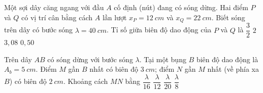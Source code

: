 \begin{ex}%
Một sợi dây căng ngang với đầu $A$ cố định (nút) đang có sóng dừng.  
Hai điểm $P$ và $Q$ có vị trí cân bằng cách $A$ lần lượt $x_P=12\ cm$ và $x_Q=22\ cm$.  
Biết sóng trên dây có bước sóng $\lambda=40\ cm$.  
Tỉ số giữa biên độ dao động của $P$ và $Q$ là
\choice
{$\dfrac{3}{2}$}
{$2$}
{\True $3,08$}
{$0,50$}
\end{ex}
\begin{ex}%
Trên dây $AB$ có sóng dừng với bước sóng $\lambda$. Tại một bụng $B$ biên độ dao động là $A_b = 5\ cm$. Điểm $M$ gần $B$ nhất có biên độ $3\ cm$; điểm $N$ gần $M$ nhất (về phía xa $B$) có biên độ $2\ cm$. Khoảng cách $MN$ bằng
\choice
{$\dfrac{\lambda}{16}$}
{$\dfrac{\lambda}{12}$}
{\True $\dfrac{\lambda}{20}$}
{$\dfrac{\lambda}{8}$}
\end{ex}
